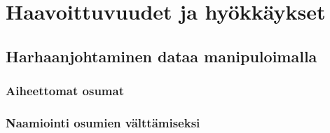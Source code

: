 \chapter{Haavoittuvuudet ja hyökkäykset}

\section{Harhaanjohtaminen dataa manipuloimalla}

\subsection{Aiheettomat osumat}

\subsection{Naamiointi osumien välttämiseksi}

